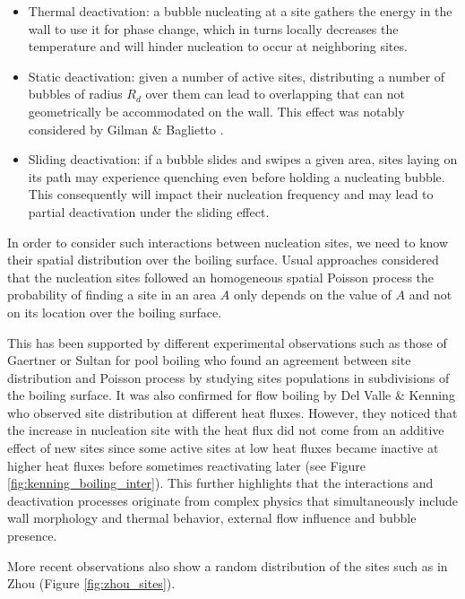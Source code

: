 \begin{itemize}
\item Thermal deactivation: a bubble nucleating at a site gathers the energy in the wall to use it for phase change, which in turns locally decreases the temperature and will hinder nucleation to occur at neighboring sites.
\item Static deactivation: given a number of active sites, distributing a number of bubbles of radius $R_{d}$ over them can lead to overlapping that can not geometrically be accommodated on the wall. This effect was notably considered by Gilman \& Baglietto \cite{gilman_self-consistent_2017}.
\item Sliding deactivation: if a bubble slides and swipes a given area, sites laying on its path may experience quenching even before holding a nucleating bubble. This consequently will impact their nucleation frequency and may lead to partial deactivation under the sliding effect.
\end{itemize} 


In order to consider such interactions between nucleation sites, we need to know their spatial distribution over the boiling surface. Usual approaches considered that the nucleation sites followed an homogeneous spatial Poisson process \ie the probability of finding a site in an area $A$ only depends on the value of $A$ and not on its location over the boiling surface.

\npar
This has been supported by different experimental observations such as those of Gaertner \cite{gaertner_population_1960} or Sultan \cite{sultan_spatial_1978} for pool boiling who found an agreement between site distribution and Poisson process by studying sites populations in subdivisions of the boiling surface. It was also confirmed for flow boiling by Del Valle \& Kenning \cite{del_valle_subcooled_1985} who observed site distribution at different heat fluxes. However, they noticed that the increase in nucleation site with the heat flux did not come from an additive effect of new sites since some active sites at low heat fluxes became inactive at higher heat fluxes before sometimes reactivating later (see Figure \ref{fig:kenning_boiling_inter}). This further highlights that the interactions and deactivation processes originate from complex physics that simultaneously include wall morphology and thermal behavior, external flow influence and bubble presence. 

\npar

More recent observations also show a random distribution of the sites such as in Zhou \etal \cite{zhou_experimental_2020-1} (Figure \ref{fig:zhou_sites}).

